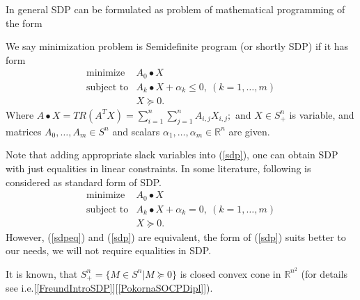 \documentclass[10pt,oneside]{book}
\theoremstyle{definition}
\begin{document}
In general SDP can be formulated as problem of mathematical programming of the form

%



\label{defSDP}
We say minimization problem is Semidefinite program (or shortly SDP) if it has form
\begin{equation}
\label{sdp} 
\begin{array}{ll}
\mbox{minimize} & A_0\bullet X \\
\mbox{subject to}& A_k\bullet X + \alpha_k \leq 0, \ (k = 1,\dots ,m) \\
& X \succeq 0.
\end{array} 
\end{equation}
Where $A\bullet X = TR(A^TX) = \sum_{i=1}^n\sum_{j=1}^n A_{i,j} X_{i,j};$ and $X\in S^n_+$ is variable, and matrices $A_0,\dots , A_m \in S^n$ and scalars $\alpha_1,\dots, \alpha_m \in \mathbb{R}^n$ are given.

\bigskip


Note that adding appropriate slack variables into (\ref{sdp}), one can obtain SDP with just equalities in linear constraints. In some literature, following is considered as standard form of SDP. 
\begin{equation}
\label{sdpeq} 
\begin{array}{ll}
\mbox{minimize} & A_0\bullet X \\
\mbox{subject to}& A_k\bullet X + \alpha_k = 0, \ (k = 1,\dots ,m) \\
& X \succeq 0.
\end{array} 
\end{equation}
However, (\ref{sdpeq}) and (\ref{sdp}) are equivalent, the form of (\ref{sdp}) suits better to our needs, we will not require equalities in SDP.

\rem It is known, that $S^n_+ = \{M\in S^n | M\succeq 0\}$ is closed convex cone in $\mathbb{R}^{n^2}$ (for details see i.e.[\ref{FreundIntroSDP}][\ref{PokornaSOCPDipl}]).
 
\end{document}
